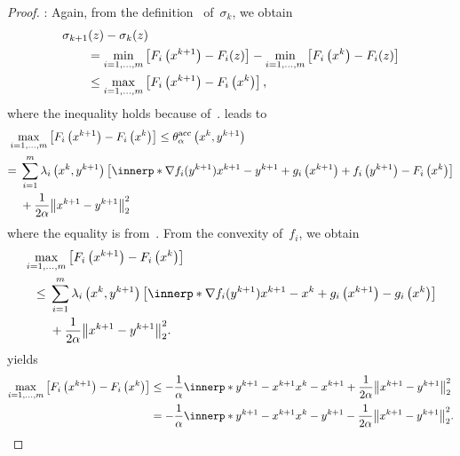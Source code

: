 \documentclass[../main]{subfiles}
\begin{document}
\begin{proof}
    :
    Again, from the definition~ of~$\sigma_k$, we obtain
    \begin{align}
        \MoveEqLeft \sigma_{k + 1}(z) - \sigma_k(z)                                                                                                       \\
         & =  \min_{i = 1, \dots, m}\left[ F_i\left(x^{k + 1}\right) - F_i(z) \right] - \min_{i = 1, \dots, m}\left[ F_i\left(x^k\right) - F_i(z) \right] \\
         & \le \max_{i = 1, \dots, m}\left[ F_i\left(x^{k + 1}\right) - F_i\left(x^k\right) \right]
        ,\end{align}
    where the inequality holds because of~.
     leads to
    \begin{align}
        \MoveEqLeft[1] \max_{i = 1, \dots, m} \left[ F_i\left( x^{k + 1} \right) - F_i\left( x^k \right) \right] \le \theta^\acc_\alpha\left( x^k, y^{k + 1} \right)                                                            \\
        ={} & \sum_{i = 1}^{m} \lambda_i\left( x^k, y^{k + 1} \right) \left[ \innerp*{\nabla f_i(y^{k + 1})}{x^{k + 1} - y^{k + 1}} + g_i\left( x^{k + 1} \right) + f_i\left( y^{k + 1} \right) - F_i\left( x^k \right) \right] \\
            & + \frac{1}{2 \alpha} \norm*{x^{k + 1} - y^{k + 1}}_2^2
    \end{align}
    where the equality is from~.
    From the convexity of~$f_i$, we obtain
    \begin{align}
        \MoveEqLeft  \max_{i = 1, \dots, m} \left[ F_i\left( x^{k + 1} \right) - F_i\left( x^k \right) \right]                                                                                \\
        \le{} & \sum_{i = 1}^{m} \lambda_i\left( x^k, y^{k + 1} \right) \left[ \innerp*{\nabla f_i(y^{k + 1})}{x^{k + 1} - x^k} + g_i\left( x^{k + 1} \right) - g_i\left( x^k \right) \right] \\
              & + \frac{1}{2 \alpha} \norm*{x^{k + 1} - y^{k + 1}}_2^2
        .\end{align}
     yields
    \begin{align}
        \max_{i = 1, \dots, m} \left[ F_i\left( x^{k + 1} \right) - F_i\left( x^k \right) \right]
         & \le - \frac{1}{\alpha} \innerp*{y^{k + 1} - x^{k + 1}}{x^k - x^{k + 1}} + \frac{1}{2 \alpha} \norm*{x^{k + 1} - y^{k + 1}}_2^2 \\
         & = - \frac{1}{\alpha} \innerp*{y^{k + 1} - x^{k + 1}}{x^k - y^{k + 1}} - \frac{1}{2 \alpha} \norm*{x^{k + 1} - y^{k + 1}}_2^2
        .\end{align}
\end{proof}
\end{document}
